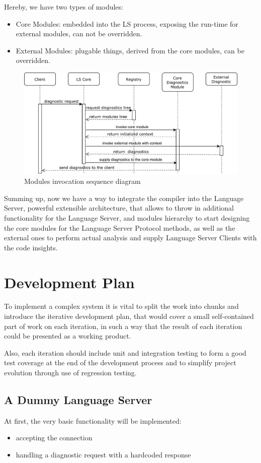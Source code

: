 Hereby, we have two types of modules:
\begin{itemize}
    \item Core Modules: embedded into the LS process, exposing the run-time for external modules, can not be overridden.
    \item External Modules: plugable things, derived from the core modules, can be overridden.
\end{itemize}

\begin{figure}[H]
    \centering
    \includegraphics[width=1.0\textwidth]{figs/modules_sd.pdf}
    \caption{Modules invocation sequence diagram}
\end{figure}

Summing up, now we have a way to integrate the compiler into the Language Server, powerful extensible architecture,
that allows to throw in additional functionality for the Language Server, 
and modules hierarchy to start designing the core modules for the Language Server Protocol methods, as well as
the external ones to perform actual analysis and supply Language Server Clients with the code insights.

\section{Development Plan}
To implement a complex system it is vital to split the work into chunks and introduce
the iterative development plan, that would cover a small self-contained part of work on each iteration,
in such a way that the result of each iteration could be presented as a working product.

Also, each iteration should include unit and integration testing to form a good test coverage
at the end of the development process and to simplify project evolution through use of regression testing.

\subsection{A Dummy Language Server}
At first, the very basic functionality will be implemented: 
\begin{itemize}
    \item accepting the connection
    \item handling a diagnostic request with a hardcoded response
\end{itemize}

